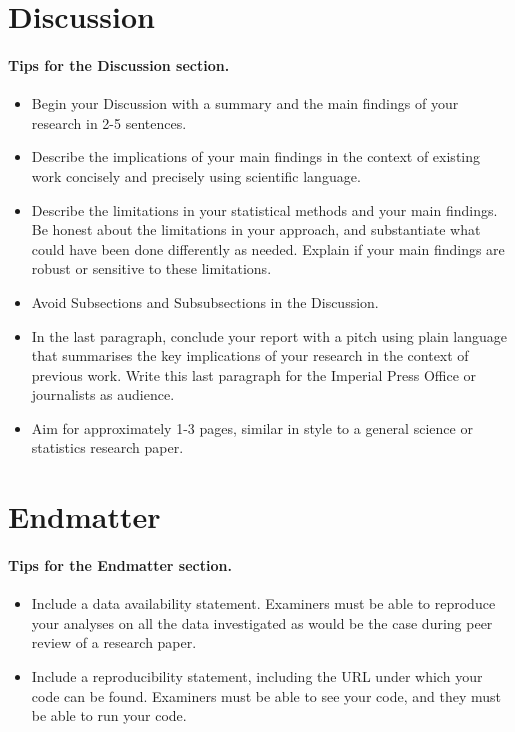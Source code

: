 \documentclass{statsmsc}
\begin{document}
\section{Discussion}

\paragraph{Tips for the Discussion section.} 

\begin{itemize}
    \item Begin your Discussion with a summary and the main findings of your research in 2-5 sentences.
    \item Describe the implications of your main findings in the context of existing work concisely and precisely using scientific language. 
    \item Describe the limitations in your statistical methods and your main findings. Be honest about the limitations in your approach, and substantiate what could have been done differently as needed. Explain if your main findings are robust or sensitive to these limitations.
    \item Avoid Subsections and Subsubsections in the Discussion.
    \item In the last paragraph, conclude your report with a pitch using plain language that summarises the key implications of your research in the context of previous work. Write this last paragraph for the Imperial Press Office or journalists as audience.
    \item Aim for approximately 1-3 pages, similar in style to a general science or statistics research paper.
\end{itemize}

\section{Endmatter} \label{sec:endmatter}

\paragraph{Tips for the Endmatter section.} 

\begin{itemize}
    \item Include a data availability statement. Examiners must be able to reproduce your analyses on all the data investigated as would be the case during peer review of a research paper.
    \item Include a reproducibility statement, including the URL under which your code can be found. Examiners must be able to see your code, and they must be able to run your code.
\end{itemize}
\end{document}
